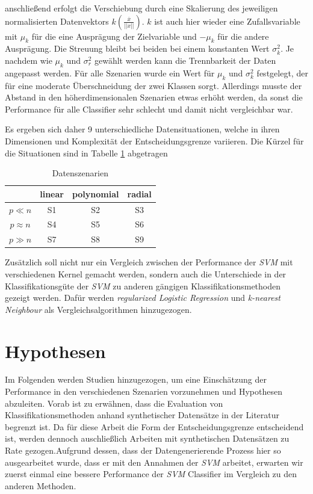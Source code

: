 \documentclass[
]{article}
\begin{document}
anschließend erfolgt die Verschiebung durch eine Skalierung des
jeweiligen normalisierten Datenvektors
\(k\left(\frac{\overline{x}}{||x||}\right)\). \(k\) ist auch hier wieder
eine Zufallsvariable mit \(\mu_k\) für die eine Ausprägung der
Zielvariable und \(-\mu_k\) für die andere Ausprägung. Die Streuung
bleibt bei beiden bei einem konstanten Wert \(\sigma^2_k\). Je nachdem
wie \(\mu_k\) und \(\sigma^2_r\) gewählt werden kann die Trennbarkeit
der Daten angepasst werden. Für alle Szenarien wurde ein Wert für
\(\mu_k\) und \(\sigma^2_k\) festgelegt, der für eine moderate
Überschneidung der zwei Klassen sorgt. Allerdings musste der Abstand in
den höherdimensionalen Szenarien etwas erhöht werden, da sonst die
Performance für alle Classifier sehr schlecht und damit nicht
vergleichbar war.

Es ergeben sich daher 9 unterschiedliche Datensituationen, welche in
ihren Dimensionen und Komplexität der Entscheidungsgrenze variieren. Die
Kürzel für die Situationen sind in Tabelle \ref{tab:datensituationen}
abgetragen

\begin{table}[H]
\begin{center}
\begin{tabular}{ |c|c|c|c| }
 \hline
  & linear & polynomial & radial \\
 \hline
 $p \ll n$ & S1 & S2 & S3 \\
 \hline
 $p \approx n$ & S4 & S5 & S6 \\
 \hline
 $p \gg n$ & S7 & S8 & S9 \\
 \hline
\end{tabular}
\end{center}
\caption{Datenszenarien}
\label{tab:datensituationen}
\end{table}

Zusätzlich soll nicht nur ein Vergleich zwischen der Performance der
\textit{SVM} mit verschiedenen Kernel gemacht werden, sondern auch die
Unterschiede in der Klassifikationsgüte der \textit{SVM} zu anderen
gängigen Klassifikationsmethoden gezeigt werden. Dafür werden
\textit{regularized Logistic Regression} und
\textit{k-nearest Neighbour} als Vergleichsalgorithmen hinzugezogen.

\section{Hypothesen}

Im Folgenden werden Studien hinzugezogen, um eine Einschätzung der
Performance in den verschiedenen Szenarien vorzunehmen und Hypothesen
abzuleiten. Vorab ist zu erwähnen, dass die Evaluation von
Klassifikationsmethoden anhand synthetischer Datensätze in der Literatur
begrenzt ist. Da für diese Arbeit die Form der Entscheidungsgrenze
entscheidend ist, werden dennoch auschließlich Arbeiten mit
synthetischen Datensätzen zu Rate gezogen.\newline Aufgrund dessen, dass
der Datengenerierende Prozess hier so ausgearbeitet wurde, dass er mit
den Annahmen der \textit{SVM} arbeitet, erwarten wir zuerst einmal eine
bessere Performance der \textit{SVM} Classifier im Vergleich zu den
anderen Methoden.
\end{document}
